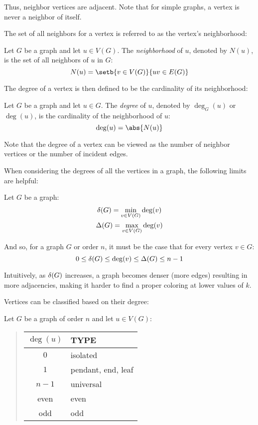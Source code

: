 Thus, neighbor vertices are adjacent.  Note that for simple graphs, a vertex is never a neighbor of itself.

The set of all neighbors for a vertex is referred to as the vertex's neighborhood:

\begin{definition}[Neighborhood]
  Let \(G\) be a graph and let \(u\in V(G)\).  The \emph{neighborhood} of \(u\), denoted by \(N(u)\), is the set of
  all neighbors of \(u\) in \(G\):
  \[N(u)=\setb{v\in V(G)}{uv\in E(G)}\]
\end{definition}

The degree of a vertex is then defined to be the cardinality of its neighborhood:

\begin{definition}[Degree]
  Let \(G\) be a graph and let \(u\in G\).  The \emph{degree} of \(u\), denoted by \(\deg_G(u)\) or \(\deg(u)\), is
  the cardinality of the neighborhood of \(u\):
  \[\deg(u)=\abs{N(u)}\]
\end{definition}

Note that the degree of a vertex can be viewed as the number of neighbor vertices or the number of incident edges.

When considering the degrees of all the vertices in a graph, the following limits are helpful:

\begin{notation}
  Let \(G\) be a graph:
  \begin{gather*}
    \delta(G)=\min_{v\in V(G)}\deg(v) \\
    \Delta(G)=\max_{v\in V(G)}\deg(v)
  \end{gather*}
\end{notation}

And so, for a graph \(G\) or order \(n\), it must be the case that for every vertex \(v\in G\):
\[0\le\delta(G)\le\deg(v)\le\Delta(G)\le n-1\]

Intuitively, as \(\delta(G)\) increases, a graph becomes denser (more edges) resulting in more adjacencies, making it
harder to find a proper coloring at lower values of \(k\).

Vertices can be classified based on their degree:

\begin{definition}
  Let \(G\) be a graph of order \(n\) and let \(u\in V(G)\):
  \begin{quote}
    \begin{tabular}{|c|l|}
      \hline
      \(\deg(u)\) & TYPE \\
      \hline
      \(0\) & isolated \\
      \(1\) & pendant, end, leaf \\
      \(n-1\) & universal \\
      even & even \\
      odd & odd \\
      \hline
    \end{tabular}
  \end{quote}
\end{definition}

